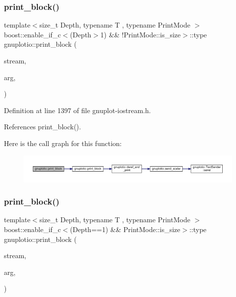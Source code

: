 \subsubsection{\texorpdfstring{print\+\_\+block()}{print\_block()}\hspace{0.1cm}{\footnotesize\ttfamily [2/4]}}
{\footnotesize\ttfamily template$<$size\+\_\+t Depth, typename T , typename Print\+Mode $>$ \\
boost\+::enable\+\_\+if\+\_\+c$<$(Depth$>$1) \&\& !Print\+Mode\+::is\+\_\+size$>$\+::type gnuplotio\+::print\+\_\+block (\begin{DoxyParamCaption}\item[{std\+::ostream \&}]{stream,  }\item[{T \&}]{arg,  }\item[{Print\+Mode}]{ }\end{DoxyParamCaption})}



Definition at line 1397 of file gnuplot-\/iostream.\+h.



References print\+\_\+block().

Here is the call graph for this function\+:\nopagebreak
\begin{figure}[H]
\begin{center}
\leavevmode
\includegraphics[width=350pt]{namespacegnuplotio_a753a3551f418723c022be60c12379025_cgraph}
\end{center}
\end{figure}
\mbox{\label{namespacegnuplotio_ae470a0908ac5f51527ff76ecbc1616d1}} 
\subsubsection{\texorpdfstring{print\+\_\+block()}{print\_block()}\hspace{0.1cm}{\footnotesize\ttfamily [3/4]}}
{\footnotesize\ttfamily template$<$size\+\_\+t Depth, typename T , typename Print\+Mode $>$ \\
boost\+::enable\+\_\+if\+\_\+c$<$(Depth==1) \&\& Print\+Mode\+::is\+\_\+size$>$\+::type gnuplotio\+::print\+\_\+block (\begin{DoxyParamCaption}\item[{std\+::ostream \&}]{stream,  }\item[{T \&}]{arg,  }\item[{Print\+Mode}]{ }\end{DoxyParamCaption})}



